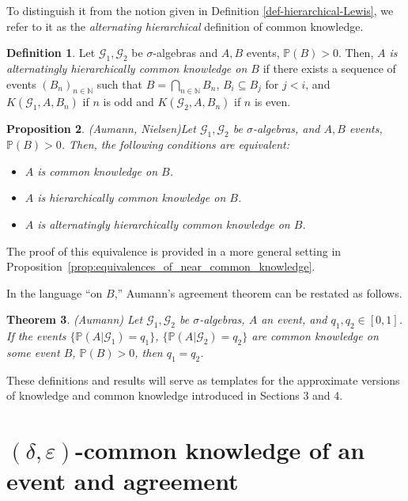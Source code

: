 \documentclass[a4paper, 10pt]{article}
\newtheorem{theorem}{Theorem}
\numberwithin{theorem}{section}
\newtheorem{prop}[theorem]{Proposition}
\theoremstyle{definition}
\newtheorem{definition}[theorem]{Definition}
\newcommand{\N}{\mathbb{N}}
\newcommand{\G}{\mathcal{G}}
\renewcommand{\epsilon}{\varepsilon}
\renewcommand{\P}{\mathbb{P}}
\begin{document}
To distinguish it from the notion given in Definition \ref{def-hierarchical-Lewis}, we refer to it as the 
\emph{alternating hierarchical} definition of common knowledge.

\begin{definition}
	Let $\G_1,\G_2$ be $\sigma$-algebras and $A,B$ events, $\P(B)>0$. Then, \emph{$A$ is alternatingly hierarchically common knowledge on $B$} if there exists a sequence of events $(B_n)_{n\in \N}$ such that $B=\bigcap_{n\in \N} B_n$, $B_i \subseteq B_j$ for $j < i$, and $K(\G_1, A, B_n)$ if $n$ is odd and $K(\G_2,A,B_n)$ if $n$ is even.    
\end{definition} 

\begin{prop}(Aumann, Nielsen)\label{lemma:ck_in_two_ways}
	Let $\G_1,\G_2$ be $\sigma$-algebras, and $A,B$ events, $\P(B)>0$. Then, the following conditions are equivalent:
	\begin{itemize}
		\item [(1)]  $A$ is common knowledge on $B$.
		\item [(2)]  $A$ is hierarchically common knowledge on $B$.
		\item [(3)]  $A$ is alternatingly hierarchically common knowledge on $B$.
	\end{itemize}
\end{prop}

The proof of this equivalence is provided in a more general setting in Proposition~\ref{prop:equivalences_of_near_common_knowledge}.

In the language ``on $B$,'' Aumann's agreement theorem can be restated as follows.

\begin{theorem}{(Aumann)} \label{theo:Aumann}
	Let $\G_1,\G_2$ be $\sigma$-algebras, $A$ an event, and $q_1,q_2 \in [0,1]$. If the events $\{\P(A|\G_1)=q_1\}$, $\{ \P(A|\G_2)=q_2\}$ are common knowledge on some event $B$, $\P(B)>0$, then $q_1=q_2$.
\end{theorem}

These definitions and results will serve as templates for the approximate versions of knowledge and common knowledge introduced in Sections 3 and 4. 


\boldmath 
\section{ ${(\delta,\epsilon)}$-common knowledge of an event and agreement}
\unboldmath 
\end{document}
